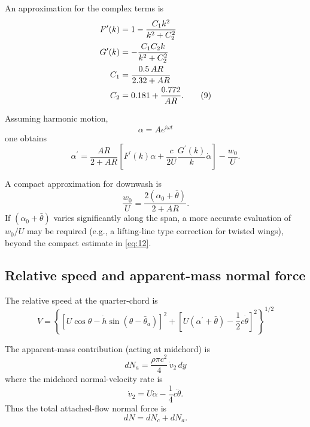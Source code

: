 \documentclass[11pt,a4paper]{article}
\begin{document}
An approximation for the complex terms is
\begin{align}
F^\prime(k)&=1-\frac{C_1k^2}{k^2+C_2^2}\notag\\
G^\prime(k)&=-\frac{C_1C_2k}{k^2+C_2^2}\notag\\
C_1&=\frac{0.5\,AR}{2.32+AR}\notag\\
C_2&=0.181+\frac{0.772}{AR}.
\tag{9}\label{eq:9_block}
\end{align}

Assuming harmonic motion,
\begin{equation}
\alpha=Ae^{i\omega t}
\tag{10}\label{eq:10}
\end{equation}
one obtains
\begin{equation}
\alpha^\prime=\frac{AR}{2+AR}\left[F^\prime(k)\alpha+\frac{c}{2U}\frac{G^\prime(k)}{k}\dot{\alpha}\right]-\frac{w_0}{U}.
\tag{11}\label{eq:11}
\end{equation}

A compact approximation for downwash is
\begin{equation}
\frac{w_0}{U}=\frac{2(\alpha_0+\bar{\theta})}{2+AR}.
\tag{12}\label{eq:12}
\end{equation}
If $(\alpha_0+\bar{\theta})$ varies significantly along the span, a more accurate evaluation of $w_0/U$
may be required (e.g., a lifting-line type correction for twisted wings), beyond the compact estimate in \eqref{eq:12}.

\subsection{Relative speed and apparent-mass normal force}
The relative speed at the quarter-chord is
\begin{equation}
V=\left\{\left[U\cos\theta-\dot{h}\sin(\theta-\bar{\theta}_a)\right]^2+
\left[U(\alpha^\prime+\bar{\theta})-\frac{1}{2}c\dot{\theta}\right]^2\right\}^{1/2}
\tag{13}\label{eq:13}
\end{equation}

The apparent-mass contribution (acting at midchord) is
\begin{equation}
dN_a=\frac{\rho\pi c^2}{4}\,\dot{v}_2\,dy
\tag{14}\label{eq:14}
\end{equation}
where the midchord normal-velocity rate is
\begin{equation}
\dot{v}_2=U\dot{\alpha}-\frac{1}{4}c\ddot{\theta}.
\tag{15}\label{eq:15}
\end{equation}
Thus the total attached-flow normal force is
\begin{equation}
dN=dN_c+dN_a.
\tag{16}\label{eq:16}
\end{equation}
\end{document}
